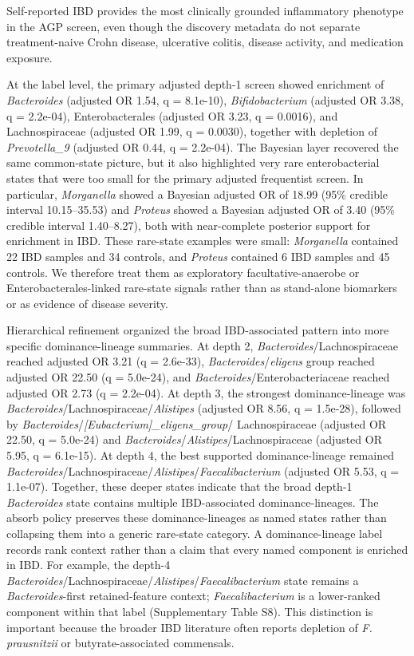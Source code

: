 \documentclass[
  11pt,
]{article}
\newcommand{\taxon}[1]{\emph{#1}}
\newcommand{\dcstsep}{/\allowbreak}
\begin{document}
Self-reported IBD provides the most clinically grounded inflammatory
phenotype in the AGP screen, even though the discovery metadata do not
separate treatment-naive Crohn disease, ulcerative colitis, disease
activity, and medication exposure.

At the label level, the primary adjusted depth-1 screen showed
enrichment of \taxon{Bacteroides} (adjusted OR 1.54, q =
8.1e-10), \taxon{Bifidobacterium} (adjusted OR 3.38, q =
2.2e-04), Enterobacterales (adjusted OR 3.23, q = 0.0016), and
Lachnospiraceae (adjusted OR 1.99, q = 0.0030), together with
depletion of \taxon{Prevotella\_9} (adjusted OR 0.44, q =
2.2e-04). The Bayesian layer recovered the same common-state picture,
but it also highlighted very rare enterobacterial states that were too
small for the primary adjusted frequentist screen. In particular,
\taxon{Morganella} showed a Bayesian adjusted OR of 18.99
(95\% credible interval 10.15--35.53) and \taxon{Proteus} showed a
Bayesian adjusted OR of 3.40 (95\% credible interval 1.40--8.27), both
with near-complete posterior support for enrichment in IBD. These
rare-state examples were small: \taxon{Morganella} contained 22 IBD
samples and 34 controls, and \taxon{Proteus} contained 6 IBD samples and
45 controls. We therefore treat them as exploratory facultative-anaerobe
or Enterobacterales-linked rare-state signals rather than as stand-alone
biomarkers or as evidence of disease severity.

Hierarchical refinement organized the broad IBD-associated pattern into
more specific dominance-lineage summaries. At depth 2,
\taxon{Bacteroides}\dcstsep Lachnospiraceae reached adjusted
OR 3.21 (q = 2.6e-33), \taxon{Bacteroides}\dcstsep[\emph{Eubacterium}]
\emph{eligens} group reached adjusted OR 22.50 (q = 5.0e-24), and
\taxon{Bacteroides}\dcstsep Enterobacteriaceae reached adjusted OR 2.73
(q = 2.2e-04). At depth 3, the strongest dominance-lineage was
\taxon{Bacteroides}\dcstsep Lachnospiraceae\dcstsep\taxon{Alistipes}
(adjusted OR 8.56, q = 1.5e-28), followed by
\taxon{Bacteroides}\dcstsep\emph{[Eubacterium]\_eligens\_group}\dcstsep
Lachnospiraceae (adjusted OR 22.50, q = 5.0e-24) and
\taxon{Bacteroides}\dcstsep\taxon{Alistipes}\dcstsep Lachnospiraceae
(adjusted OR 5.95, q = 6.1e-15). At depth 4, the best supported dominance-lineage
remained
\taxon{Bacteroides}\dcstsep Lachnospiraceae\dcstsep\taxon{Alistipes}\dcstsep\taxon{Faecalibacterium}
(adjusted OR 5.53, q = 1.1e-07). Together, these deeper states indicate
that the broad depth-1 \taxon{Bacteroides} state contains multiple
IBD-associated dominance-lineages. The absorb policy preserves these
dominance-lineages as named states rather than collapsing them into a
generic rare-state category. A dominance-lineage label records rank context rather than a claim
that every named component is enriched in IBD. For example, the depth-4
\taxon{Bacteroides}\dcstsep Lachnospiraceae\dcstsep\taxon{Alistipes}\dcstsep\taxon{Faecalibacterium}
state remains a \taxon{Bacteroides}-first retained-feature context;
\taxon{Faecalibacterium} is a lower-ranked component within that label
(Supplementary Table S8). This distinction is important because the broader
IBD literature often reports depletion of \emph{F. prausnitzii} or
butyrate-associated commensals.
\end{document}
